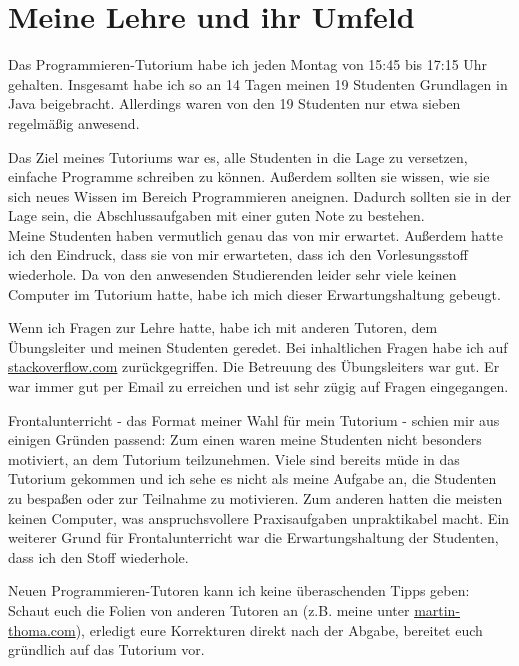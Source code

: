 \documentclass[a4paper,12pt]{article}
\newcommand{\Jahr}{2012 / 2013}         %
\newcommand{\Semester}{Wintersemester}  %
\newcommand{\Datum}{\today}             %
\newcommand{\Vorname}{Martin}
\newcommand{\Nachname}{Thoma}
\begin{document}
 
 \setcounter{page}{2}


\section*{Meine Lehre und ihr Umfeld}
Das Programmieren-Tutorium habe ich jeden Montag von 15:45 bis 17:15
Uhr gehalten. Insgesamt habe ich so an 14 Tagen meinen 19 Studenten
Grundlagen in Java beigebracht. Allerdings waren von den 19 Studenten
nur etwa sieben regelmäßig anwesend.

Das Ziel meines Tutoriums war es, alle Studenten in die Lage zu
versetzen, einfache Programme schreiben zu können. Außerdem sollten
sie wissen, wie sie sich neues Wissen im Bereich Programmieren
aneignen. Dadurch sollten sie in der Lage sein, die Abschlussaufgaben
mit einer guten Note zu bestehen.\\
Meine Studenten haben vermutlich genau das von mir erwartet. Außerdem
hatte ich den Eindruck, dass sie von mir erwarteten, dass ich den
Vorlesungsstoff wiederhole. Da von den anwesenden Studierenden leider
sehr viele keinen Computer im Tutorium hatte, habe ich mich dieser
Erwartungshaltung gebeugt.

Wenn ich Fragen zur Lehre hatte, habe ich mit anderen Tutoren, dem
Übungsleiter und meinen Studenten geredet. Bei inhaltlichen Fragen
habe ich auf \href{http://stackoverflow.com/}{stackoverflow.com}
zurückgegriffen.
Die Betreuung des Übungsleiters war gut. Er war immer gut per Email
zu erreichen und ist sehr zügig auf Fragen eingegangen.

Frontalunterricht - das Format meiner Wahl für mein Tutorium - schien
mir aus einigen Gründen passend: Zum einen waren meine Studenten
nicht besonders motiviert, an dem Tutorium teilzunehmen. Viele sind
bereits müde in das Tutorium gekommen und ich sehe es nicht als meine
Aufgabe an, die Studenten zu bespaßen oder zur Teilnahme zu
motivieren. Zum anderen hatten die meisten keinen Computer, was
anspruchsvollere Praxisaufgaben unpraktikabel macht. Ein weiterer
Grund für Frontalunterricht war die Erwartungshaltung der Studenten,
dass ich den Stoff wiederhole.

Neuen Programmieren-Tutoren kann ich keine überaschenden Tipps geben:
Schaut euch die Folien von anderen Tutoren an (z.B. meine unter
\href{martin-thoma.com/programmieren-tutorium}{martin-thoma.com}),
erledigt eure Korrekturen direkt nach der Abgabe, bereitet euch gründlich
auf das Tutorium vor.
\end{document}
